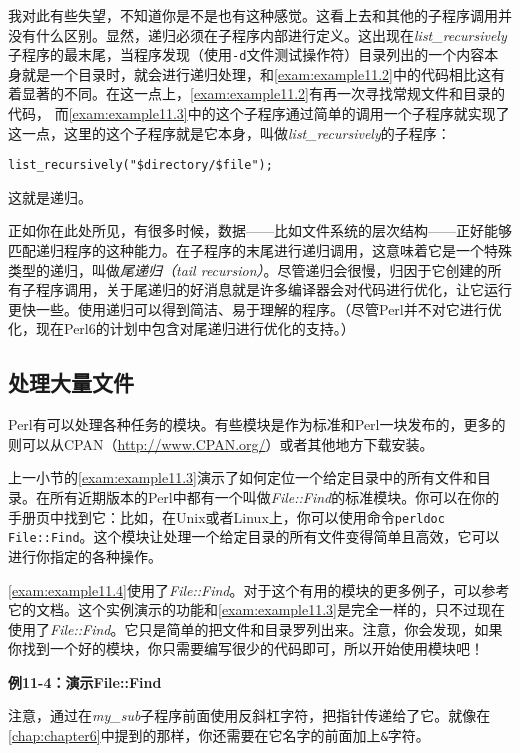 我对此有些失望，不知道你是不是也有这种感觉。这看上去和其他的子程序调用并没有什么区别。显然，递归必须在子程序内部进行定义。这出现在\textit{list\_recursively}子程序的最末尾，当程序发现（使用\verb|-d|文件测试操作符）目录列出的一个内容本身就是一个目录时，就会进行递归处理，和\autoref{exam:example11.2}中的代码相比这有着显著的不同。在这一点上，\autoref{exam:example11.2}有再一次寻找常规文件和目录的代码，
而\autoref{exam:example11.3}中的这个子程序通过简单的调用一个子程序就实现了这一点，这里的这个子程序就是它本身，叫做\textit{list\_recursively}的子程序：

\begin{lstlisting}
list_recursively("$directory/$file");
\end{lstlisting}

这就是递归。

正如你在此处所见，有很多时候，数据——比如文件系统的层次结构——正好能够匹配递归程序的这种能力。在子程序的末尾进行递归调用，这意味着它是一个特殊类型的递归，叫做\textit{尾递归（tail
recursion）}。尽管递归会很慢，归因于它创建的所有子程序调用，关于尾递归的好消息就是许多编译器会对代码进行优化，让它运行更快一些。使用递归可以得到简洁、易于理解的程序。（尽管Perl并不对它进行优化，现在Perl6的计划中包含对尾递归进行优化的支持。）

\subsection{处理大量文件}
Perl有可以处理各种任务的模块。有些模块是作为标准和Perl一块发布的，更多的则可以从CPAN（\href{http://www.CPAN.org/}{http://www.CPAN.org/}）或者其他地方下载安装。

上一小节的\autoref{exam:example11.3}演示了如何定位一个给定目录中的所有文件和目录。在所有近期版本的Perl中都有一个叫做\textit{File::Find}的标准模块。你可以在你的手册页中找到它：比如，在Unix或者Linux上，你可以使用命令\verb|perldoc File::Find|。这个模块让处理一个给定目录的所有文件变得简单且高效，它可以进行你指定的各种操作。

\autoref{exam:example11.4}使用了\textit{File::Find}。对于这个有用的模块的更多例子，可以参考它的文档。这个实例演示的功能和\autoref{exam:example11.3}是完全一样的，只不过现在使用了\textit{File::Find}。它只是简单的把文件和目录罗列出来。注意，你会发现，如果你找到一个好的模块，你只需要编写很少的代码即可，所以开始使用模块吧！

\textbf{例11-4：演示File::Find}


注意，通过在\textit{my\_sub}子程序前面使用反斜杠字符，把指针传递给了它。就像在\autoref{chap:chapter6}中提到的那样，你还需要在它名字的前面加上\verb|&|字符。

